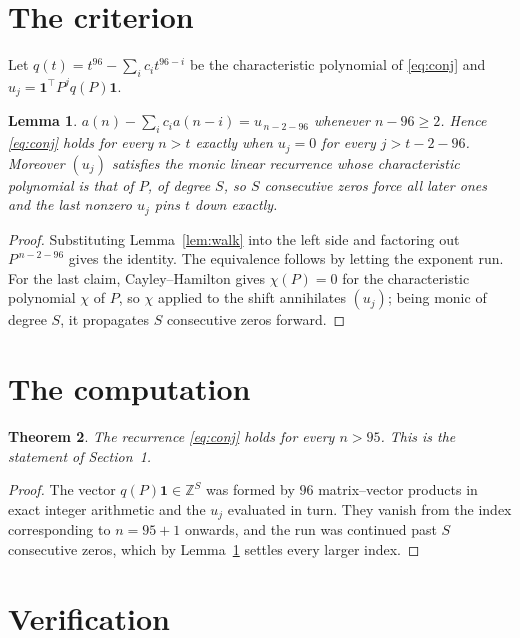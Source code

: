\documentclass[11pt,a4paper]{article}
\theoremstyle{plain}
\newtheorem{theorem}{Theorem}
\newtheorem{lemma}[theorem]{Lemma}
\theoremstyle{definition}
\begin{document}
\section{The criterion}

Let $q(t)=t^{96}-\sum_i c_i t^{96-i}$ be the characteristic polynomial of
\eqref{eq:conj} and $u_j=\mathbf{1}^{\!\top}P^{j}q(P)\mathbf{1}$.

\begin{lemma}\label{lem:crit}
$a(n)-\sum_i c_i a(n-i)=u_{\,n-2-96}$ whenever $n-96\ge2$. Hence
\eqref{eq:conj} holds for every $n>t$ exactly when $u_j=0$ for every
$j>t-2-96$. Moreover $(u_j)$ satisfies the monic linear recurrence whose
characteristic polynomial is that of $P$, of degree $S$, so $S$ consecutive zeros force all
later ones and the last nonzero $u_j$ pins $t$ down exactly.
\end{lemma}

\begin{proof}
Substituting Lemma~\ref{lem:walk} into the left side and factoring out
$P^{\,n-2-96}$ gives the identity. The equivalence follows by letting the exponent
run. For the last claim, Cayley--Hamilton gives $\chi(P)=0$ for the characteristic
polynomial $\chi$ of $P$, so $\chi$ applied to the shift annihilates $(u_j)$; being monic of
degree $S$, it propagates $S$ consecutive zeros forward.
\end{proof}

\section{The computation}

\begin{theorem}
The recurrence \eqref{eq:conj} holds for every $n>95$. This is the statement of
Section~1.
\end{theorem}

\begin{proof}
The vector $q(P)\mathbf{1}\in\mathbb{Z}^{S}$ was formed by $96$ matrix--vector
products in exact integer arithmetic and the $u_j$ evaluated in turn. They vanish from the
index corresponding to $n=95+1$ onwards, and the run was continued past $S$ consecutive
zeros, which by Lemma~\ref{lem:crit} settles every larger index.
\end{proof}

\section{Verification}
\end{document}
